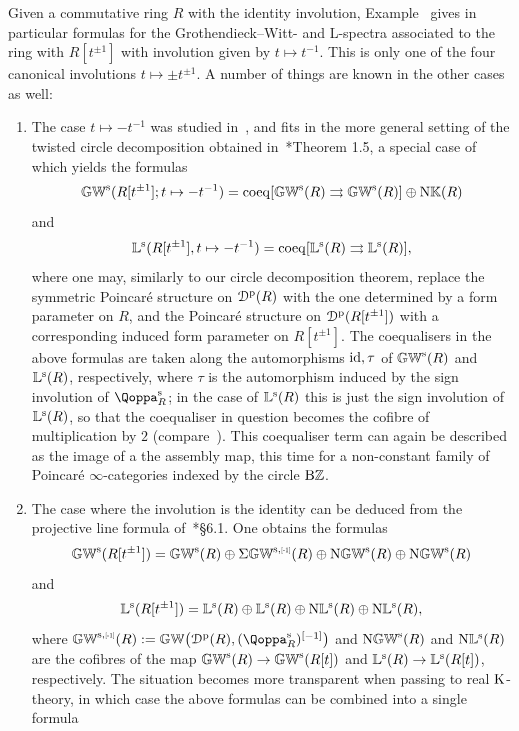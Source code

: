 \begin{remark}
\label{remark:all-involutions}%
Given a commutative ring $R$ with the identity involution, Example~ gives in particular formulas for the Grothendieck--Witt- and L-spectra associated to the ring with $R[t^{\pm 1}]$ with involution given by $t\mapsto t^{-1}$. This is only one of the four canonical involutions $t \mapsto \pm t^{\pm 1}$. A number of things are known in the other cases as well:
\begin{enumerate}
\item
\label{item:twisted}%
The case $t\mapsto -t^{-1}$ was studied in~\cite{Milgram-Ranicki}, 
and fits in the more general setting of the twisted circle decomposition obtained in~\cite{twisted-shaneson}*{Theorem 1.5}, a special case of which yields the formulas
\[
\mathbb{GW}^{\mathrm{s}}(R[t^{\pm 1}];t\mapsto -t^{-1}) = \operatorname{coeq}[\mathbb{GW}^{\mathrm{s}}(R) \rightrightarrows \mathbb{GW}^{\mathrm{s}}(R)] \oplus \mathrm{N}\mathbb K(R)
\]
and 
\[
\mathbb{L}^{\mathrm{s}}(R[t^{\pm 1}],t\mapsto -t^{-1}) = \operatorname{coeq}[\mathbb{L}^{\mathrm{s}}(R) \rightrightarrows \mathbb{L}^{\mathrm{s}}(R)] ,
\]
where one may, similarly to our circle decomposition theorem, replace the symmetric Poincaré structure
on ${\mathcal D}^{\mathrm{p}}(R)$ with the one determined by a form parameter on $R$, and the Poincaré structure on ${\mathcal D}^{\mathrm{p}}(R[t^{\pm 1}])$ with a corresponding induced form parameter on $R[t^{\pm1}]$.
The coequalisers in the above formulas are taken along the automorphisms $\mathrm{id},\tau$ of $\mathbb{GW}^{\mathrm{s}}(R)$ and $\mathbb{L}^{\mathrm{s}}(R)$, respectively, where $\tau$ is the automorphism induced by the sign involution of $\QF^{\sym}_R$; in the case of $\mathbb{L}^{\mathrm{s}}(R)$ this is just the sign involution of $\mathbb{L}^{\mathrm{s}}(R)$, so that the coequaliser in question becomes the cofibre of multiplication by $2$ (compare~\cite{Milgram-Ranicki}). This coequaliser term can again be described as the image of a the assembly map, this time for a non-constant family of Poincaré $\infty$-categories indexed by the circle $\mathrm{B}\mathbb{Z}$.
\item
\label{item:motivic}%
The case where the involution is the identity can be deduced from the projective line formula of~\cite{motives}*{\S 6.1}. One obtains the formulas
\[
\KGW^{\sym}(R[t^{\pm 1}]) = \KGW^{\sym}(R) \oplus \Sig\KGW^{\sym,\scalebox{0.5}{[-1]}}(R) \oplus \N\KGW^{\sym}(R)\oplus \N\KGW^{\sym}(R)
\]
and 
\[
 \mathbb{L}^{\mathrm{s}}(R[t^{\pm 1}]) = \mathbb{L}^{\mathrm{s}}(R) \oplus \mathbb{L}^{\mathrm{s}}(R) \oplus \mathrm{N}\mathbb{L}^{\mathrm{s}}(R)\oplus \mathrm{N}\mathbb{L}^{\mathrm{s}}(R),
\]
where $\KGW^{\sym,\scalebox{0.5}{[-1]}}(R):=\KGW\big(\Dperf(R),(\QF^{\sym}_R)\qshift{-1}\big)$ and $\mathrm{N}\mathbb{GW}^{\mathrm{s}}(R)$ and $\mathrm{N}\mathbb{L}^{\mathrm{s}}(R)$ are the cofibres of the map $\mathbb{GW}^{\mathrm{s}}(R) \to \mathbb{GW}^{\mathrm{s}}(R[t])$ and $\mathbb{L}^{\mathrm{s}}(R) \to \mathbb{L}^{\mathrm{s}}(R[t])$, respectively. The situation becomes more transparent when passing to real $\operatorname K$-theory, in which case the above formulas can be combined into a single formula %

\end{enumerate}
\end{remark}
